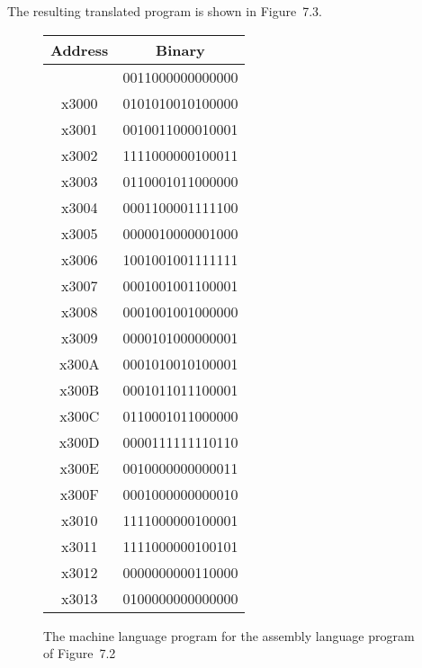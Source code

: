 \documentclass{patt}
\begin{document}
The resulting translated program is shown in Figure~7.3.

\begin{figure}
\begin{center}
\small
\begin{tabular}
{cc}
\hline
\multicolumn{1}{|c|}{Address}&
\multicolumn{1}{c|}{Binary} \\
\hline
\hline
\multicolumn{1}{|c|}{}&
\multicolumn{1}{|c|}{0011000000000000} \\
\hline
\multicolumn{1}{|c|}{x3000}&
\multicolumn{1}{|c|}{0101010010100000} \\
\hline
\multicolumn{1}{|c|}{x3001}&
\multicolumn{1}{|c|}{0010011000010001} \\
\hline
\multicolumn{1}{|c|}{x3002}&
\multicolumn{1}{|c|}{1111000000100011} \\
\hline
\multicolumn{1}{|c|}{x3003}&
\multicolumn{1}{|c|}{0110001011000000} \\
\hline
\multicolumn{1}{|c|}{x3004}&
\multicolumn{1}{|c|}{0001100001111100} \\
\hline
\multicolumn{1}{|c|}{x3005}&
\multicolumn{1}{|c|}{0000010000001000} \\
\hline
\multicolumn{1}{|c|}{x3006}&
\multicolumn{1}{|c|}{1001001001111111} \\
\hline
\multicolumn{1}{|c|}{x3007}&
\multicolumn{1}{|c|}{0001001001100001} \\
\hline
\multicolumn{1}{|c|}{x3008}&
\multicolumn{1}{|c|}{0001001001000000} \\
\hline
\multicolumn{1}{|c|}{x3009}&
\multicolumn{1}{|c|}{0000101000000001} \\
\hline
\multicolumn{1}{|c|}{x300A}&
\multicolumn{1}{|c|}{0001010010100001} \\
\hline
\multicolumn{1}{|c|}{x300B}&
\multicolumn{1}{|c|}{0001011011100001} \\
\hline
\multicolumn{1}{|c|}{x300C}&
\multicolumn{1}{|c|}{0110001011000000} \\
\hline
\multicolumn{1}{|c|}{x300D}&
\multicolumn{1}{|c|}{0000111111110110} \\
\hline
\multicolumn{1}{|c|}{x300E}&
\multicolumn{1}{|c|}{0010000000000011} \\
\hline
\multicolumn{1}{|c|}{x300F}&
\multicolumn{1}{|c|}{0001000000000010} \\
\hline
\multicolumn{1}{|c|}{x3010}&
\multicolumn{1}{|c|}{1111000000100001} \\
\hline
\multicolumn{1}{|c|}{x3011}&
\multicolumn{1}{|c|}{1111000000100101} \\
\hline
\multicolumn{1}{|c|}{x3012}&
\multicolumn{1}{|c|}{0000000000110000} \\
\hline
\multicolumn{1}{|c|}{x3013}&
\multicolumn{1}{|c|}{0100000000000000} \\
\hline
\end{tabular}
\end{center}
\caption{The machine language program for the
assembly language program of Figure~7.2}
\vspace{12pt}
\end{figure}
\end{document}
